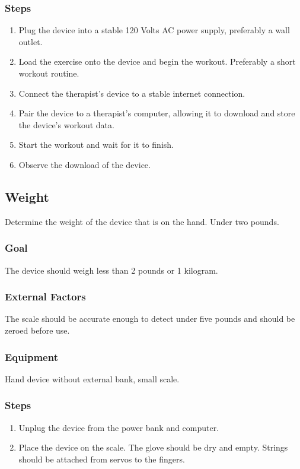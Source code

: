 \documentclass{article}
\begin{document}
\subsubsection{Steps}
\begin{enumerate}
\item Plug the device into a stable 120 Volts AC power supply, preferably a wall outlet.
\item Load the exercise onto the device and begin the workout. Preferably a short workout routine.
\item Connect the therapist's device to a stable internet connection.
\item Pair the device to a therapist's computer, allowing it to download and store the device's workout data.
\item Start the workout and wait for it to finish.
\item Observe the download of the device.
\end{enumerate}

\subsection{Weight}
Determine the weight of the device that is on the hand. Under two pounds.

\subsubsection{Goal} The device should weigh less than 2 pounds or 1 kilogram.

\subsubsection{External Factors} The scale should be accurate enough to detect under five pounds and should be zeroed before use.

\subsubsection{Equipment} Hand device without external bank, small scale.

\subsubsection{Steps}
\begin{enumerate}
\item Unplug the device from the power bank and computer.
\item Place the device on the scale. The glove should be dry and empty. Strings should be attached from servos to the fingers.
\end{enumerate}
\end{document}

